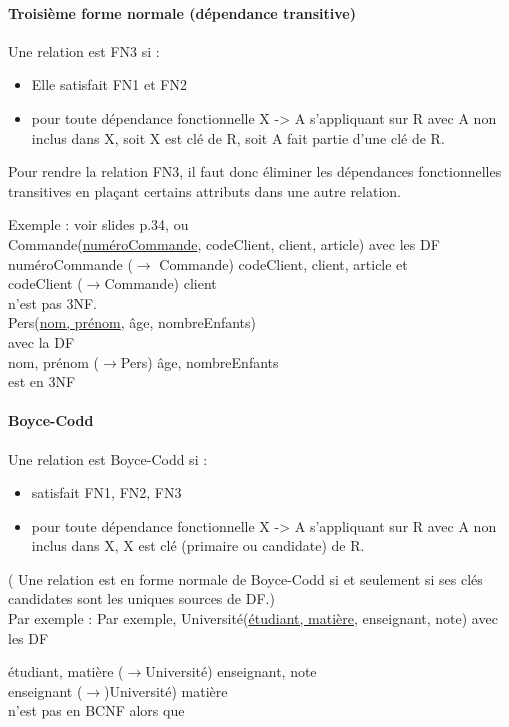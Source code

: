 \paragraph{Troisième forme normale (dépendance transitive)}
Une relation est FN3 si :
\begin{itemize}
	\item Elle satisfait FN1 et FN2
	\item pour toute dépendance fonctionnelle X -> A s'appliquant sur R avec A non inclus dans X, soit X est clé de R, soit A fait partie d'une clé de R.
\end{itemize}
Pour rendre la relation FN3, il faut donc éliminer les dépendances fonctionnelles transitives en plaçant certains attributs dans une autre relation.

Exemple : voir slides p.34, ou\\
Commande(\underline{numéroCommande}, codeClient, client, article) avec les DF\\
numéroCommande ($\rightarrow$ Commande) codeClient, client, article et\\
codeClient ($\rightarrow$Commande) client \\
n'est pas 3NF.\\

Pers(\underline{nom, prénom}, âge, nombreEnfants)\\
avec la DF\\
nom, prénom ($\rightarrow$Pers) âge, nombreEnfants\\
est en 3NF


\paragraph{Boyce-Codd}
Une relation est Boyce-Codd si :
\begin{itemize}
	\item satisfait FN1, FN2, FN3
	\item pour toute dépendance fonctionnelle X -> A s'appliquant sur R avec A non inclus dans X, X est clé (primaire ou candidate) de R.
\end{itemize}
( Une relation est en forme normale de Boyce-Codd si et seulement si ses clés candidates sont les uniques sources de DF.)\\

Par exemple : 
Par exemple, Université(\underline{étudiant, matière}, enseignant, note) avec les DF

étudiant, matière ($\rightarrow$Université) enseignant, note \\
enseignant ($\rightarrow$)Université) matière\\
n'est pas en BCNF alors que \\

